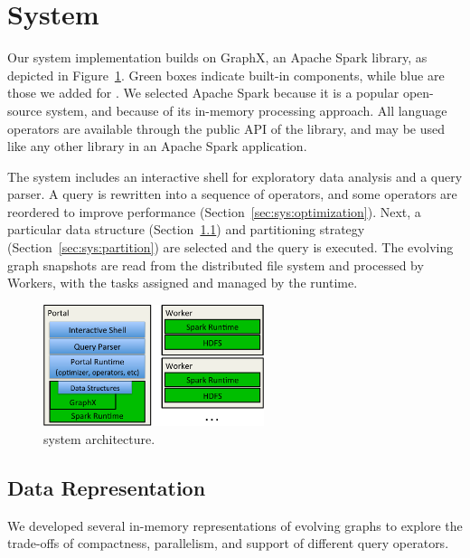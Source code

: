 \section{System}
\label{sec:sys}

Our \ql system implementation builds on GraphX, an Apache Spark
library, as depicted in Figure~\ref{fig:arch}.  Green boxes indicate
built-in components, while blue are those we added for \ql.  We
selected Apache Spark because it is a popular open-source system, and
because of its in-memory processing approach.  All language operators
are available through the public API of the \ql library, and may be
used like any other library in an Apache Spark application.

The \ql system includes an interactive shell for exploratory data
analysis and a query parser.  A \ql query is rewritten into a sequence
of operators, and some operators are reordered to improve performance
(Section~\ref{sec:sys:optimization}).  Next, a particular data
structure (Section~\ref{sec:sys:datastructs}) and partitioning
strategy (Section~\ref{sec:sys:partition}) are selected and the query
is executed.  The evolving graph snapshots are read from the
distributed file system and processed by Workers, with the tasks
assigned and managed by the runtime.

\begin{figure}[t!]
\begin{center}
\includegraphics[height=1.4in]{figs/architecture.pdf}
\caption{\ql system architecture.}
\label{fig:arch}
\end{center}
\vspace{-0.5cm}
\end{figure}



\subsection{Data Representation}
\label{sec:sys:datastructs}

We developed several in-memory representations of evolving graphs to
explore the trade-offs of compactness, parallelism, and support of
different query operators. 

